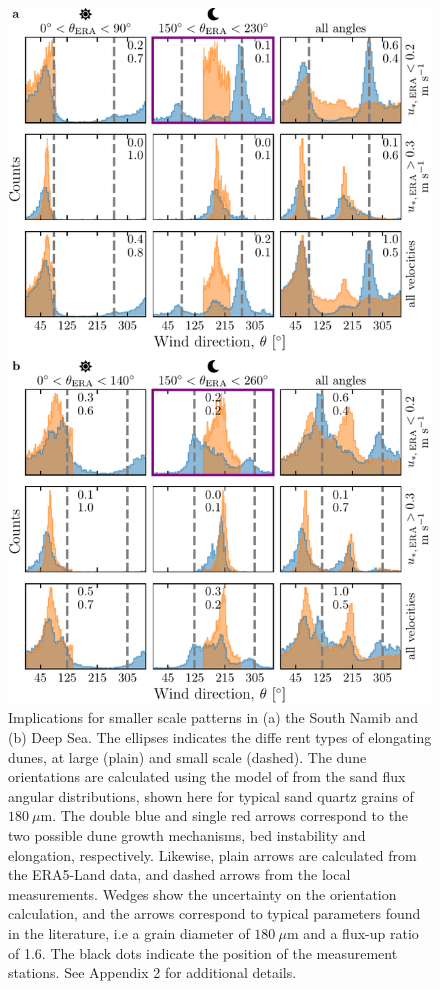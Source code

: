   \begin{figure}
    \centering
    \includegraphics[scale=1]{Figures/Figure6.pdf}
    \caption{Implications for smaller scale patterns in (a) the South Namib and (b) Deep Sea. The ellipses indicates the diffe  rent types of elongating dunes, at large (plain) and small scale (dashed). The dune orientations are calculated using the model of \citet{Courrech2014} from the sand flux angular distributions, shown here for typical sand quartz grains of $180~\mu$m. The double blue and single red arrows correspond to the two possible dune growth mechanisms, bed instability and elongation, respectively. Likewise, plain arrows are calculated from the ERA5-Land data, and dashed arrows from the local measurements. Wedges show the uncertainty on the orientation calculation, and the arrows correspond to typical parameters found in the literature, i.e a grain diameter of $180~\mu$m and a flux-up ratio of 1.6. The black dots indicate the position of the measurement stations. See Appendix 2 for additional details.}
    \label{Fig6}
  \end{figure}

